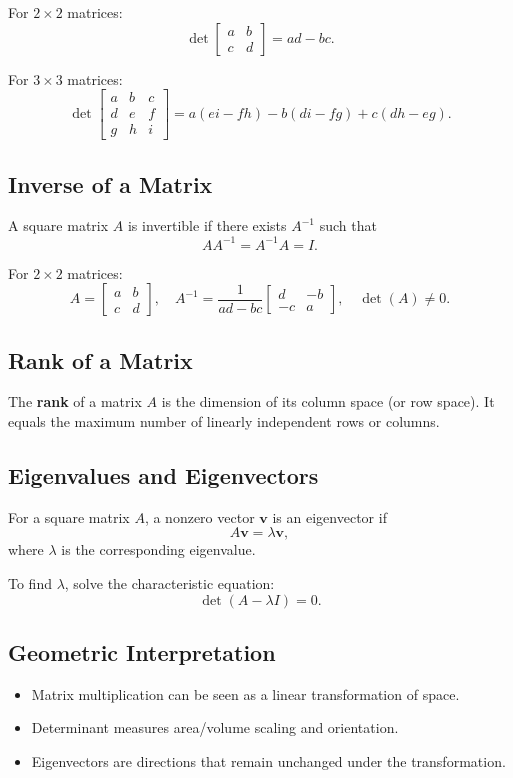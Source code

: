\documentclass[a4paper,12pt]{article}
\begin{document}
For $2 \times 2$ matrices:
\[
\det\begin{bmatrix}
a & b \\
c & d
\end{bmatrix} = ad - bc.
\]

For $3 \times 3$ matrices:
\[
\det\begin{bmatrix}
a & b & c \\
d & e & f \\
g & h & i
\end{bmatrix}
= a(ei - fh) - b(di - fg) + c(dh - eg).
\]

\subsection{Inverse of a Matrix}
A square matrix $A$ is invertible if there exists $A^{-1}$ such that
\[
AA^{-1} = A^{-1}A = I.
\]

For $2 \times 2$ matrices:
\[
A = \begin{bmatrix} a & b \\ c & d \end{bmatrix}, \quad
A^{-1} = \frac{1}{ad - bc} \begin{bmatrix} d & -b \\ -c & a \end{bmatrix}, \quad \det(A) \neq 0.
\]

\subsection{Rank of a Matrix}
The \textbf{rank} of a matrix $A$ is the dimension of its column space (or row space).  
It equals the maximum number of linearly independent rows or columns.

\subsection{Eigenvalues and Eigenvectors}
For a square matrix $A$, a nonzero vector $\mathbf{v}$ is an eigenvector if
\[
A\mathbf{v} = \lambda \mathbf{v},
\]
where $\lambda$ is the corresponding eigenvalue.  

To find $\lambda$, solve the characteristic equation:
\[
\det(A - \lambda I) = 0.
\]

\subsection{Geometric Interpretation}
\begin{itemize}
    \item Matrix multiplication can be seen as a linear transformation of space.  
    \item Determinant measures area/volume scaling and orientation.  
    \item Eigenvectors are directions that remain unchanged under the transformation.  
\end{itemize}
\end{document}
